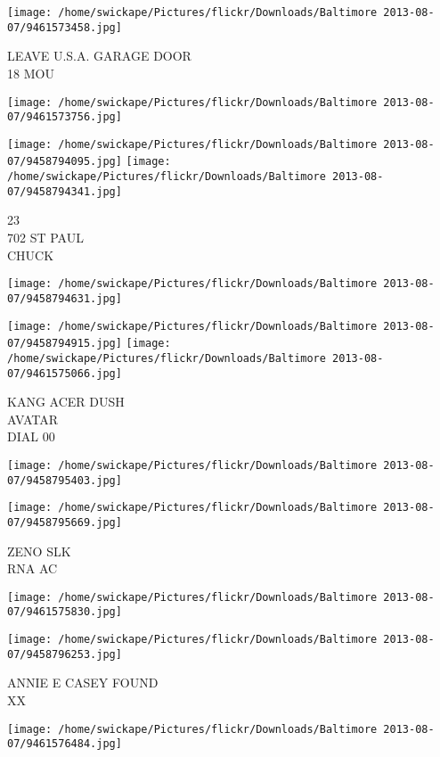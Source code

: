 \documentclass[10pt,letterpaper]{article}
\begin{document}
\vspace{0.25in}
\texttt{[image: /home/swickape/Pictures/flickr/Downloads/Baltimore 2013-08-07/9461573458.jpg]}

LEAVE U.S.A. GARAGE DOOR\\
18 MOU
\pagebreak

\texttt{[image: /home/swickape/Pictures/flickr/Downloads/Baltimore 2013-08-07/9461573756.jpg]}

\vspace{0.25in}
\texttt{[image: /home/swickape/Pictures/flickr/Downloads/Baltimore 2013-08-07/9458794095.jpg]}
\texttt{[image: /home/swickape/Pictures/flickr/Downloads/Baltimore 2013-08-07/9458794341.jpg]}

23\\
702 ST PAUL\\
CHUCK
\pagebreak

\texttt{[image: /home/swickape/Pictures/flickr/Downloads/Baltimore 2013-08-07/9458794631.jpg]}

\vspace{0.25in}
\texttt{[image: /home/swickape/Pictures/flickr/Downloads/Baltimore 2013-08-07/9458794915.jpg]}
\texttt{[image: /home/swickape/Pictures/flickr/Downloads/Baltimore 2013-08-07/9461575066.jpg]}

KANG ACER DUSH\\
AVATAR\\
DIAL 00
\pagebreak

\texttt{[image: /home/swickape/Pictures/flickr/Downloads/Baltimore 2013-08-07/9458795403.jpg]}

\vspace{0.25in}
\texttt{[image: /home/swickape/Pictures/flickr/Downloads/Baltimore 2013-08-07/9458795669.jpg]}

ZENO SLK\\
RNA AC
\pagebreak

\texttt{[image: /home/swickape/Pictures/flickr/Downloads/Baltimore 2013-08-07/9461575830.jpg]}

\vspace{0.25in}
\texttt{[image: /home/swickape/Pictures/flickr/Downloads/Baltimore 2013-08-07/9458796253.jpg]}

ANNIE E CASEY FOUND\\
XX
\pagebreak

\texttt{[image: /home/swickape/Pictures/flickr/Downloads/Baltimore 2013-08-07/9461576484.jpg]}
\end{document}
